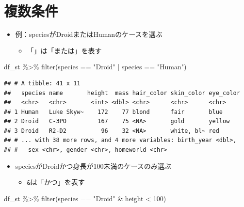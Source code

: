 \documentclass[
  xelatex,ja=standard, b5paper]{bxjsbook}
\newenvironment{Shaded}{\begin{snugshade}}{\end{snugshade}}
\newcommand{\DecValTok}[1]{\textcolor[rgb]{0.00,0.00,0.81}{#1}}
\newcommand{\FunctionTok}[1]{\textcolor[rgb]{0.00,0.00,0.00}{#1}}
\newcommand{\NormalTok}[1]{#1}
\newcommand{\SpecialCharTok}[1]{\textcolor[rgb]{0.00,0.00,0.00}{#1}}
\newcommand{\StringTok}[1]{\textcolor[rgb]{0.31,0.60,0.02}{#1}}
\providecommand{\tightlist}{%
  \setlength{\itemsep}{0pt}\setlength{\parskip}{0pt}}
\begin{document}
\hypertarget{filter-multi}{%
\section{複数条件}\label{filter-multi}}

\begin{itemize}
\tightlist
\item
  例：speciesがDroidまたはHumanのケースを選ぶ

  \begin{itemize}
  \tightlist
  \item
    「\texttt{\textbar{}}」は「または」を表す
  \end{itemize}
\end{itemize}

\begin{Shaded}
\begin{Highlighting}[]
\NormalTok{df\_st }\SpecialCharTok{\%\textgreater{}\%} 
  \FunctionTok{filter}\NormalTok{(species }\SpecialCharTok{==} \StringTok{"Droid"} \SpecialCharTok{|}\NormalTok{ species }\SpecialCharTok{==} \StringTok{"Human"}\NormalTok{)}
\end{Highlighting}
\end{Shaded}

\begin{verbatim}
## # A tibble: 41 x 11
##   species name       height  mass hair_color skin_color eye_color
##   <chr>   <chr>       <int> <dbl> <chr>      <chr>      <chr>    
## 1 Human   Luke Skyw~    172    77 blond      fair       blue     
## 2 Droid   C-3PO         167    75 <NA>       gold       yellow   
## 3 Droid   R2-D2          96    32 <NA>       white, bl~ red      
## # ... with 38 more rows, and 4 more variables: birth_year <dbl>,
## #   sex <chr>, gender <chr>, homeworld <chr>
\end{verbatim}

\begin{itemize}
\tightlist
\item
  speciesがDroidかつ身長が100未満のケースのみ選ぶ

  \begin{itemize}
  \tightlist
  \item
    \texttt{\&}は「かつ」を表す
  \end{itemize}
\end{itemize}

\begin{Shaded}
\begin{Highlighting}[]
\NormalTok{df\_st }\SpecialCharTok{\%\textgreater{}\%} 
  \FunctionTok{filter}\NormalTok{(species }\SpecialCharTok{==} \StringTok{"Droid"} \SpecialCharTok{\&}\NormalTok{ height }\SpecialCharTok{\textless{}} \DecValTok{100}\NormalTok{)}
\end{Highlighting}
\end{Shaded}
\end{document}
